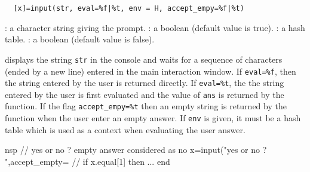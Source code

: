 \begin{mandesc}
\end{mandesc}
\begin{calling_sequence}
\begin{verbatim}
  [x]=input(str, eval=%f|%t, env = H, accept_empy=%f|%t)     
\end{verbatim}
\end{calling_sequence}
\begin{parameters}
  \begin{varlist}
    : a character string giving the prompt.
    : a boolean (default value is true).
    : a hash table.
    : a boolean (default value is false).
  \end{varlist}
\end{parameters}
\begin{mandescription}
  displays the string \verb!str! in the console and waits for a sequence 
  of characters (ended by a new line) entered in the main interaction 
  window. If \verb!eval=%f!, then the string entered by the user is 
  returned directly. If \verb!eval=%t!, the the string entered by the 
  user is first evaluated and the value of \verb!ans! is returned by 
  the function. If the flag \verb!accept_empy=%t! then an empty string 
  is returned by the function when the user enter an empty answer. 
  If \verb!env! is given, it must be a hash table which is used as a 
  context when evaluating the user answer.
\end{mandescription}
\begin{examples}
  \begin{mintednsp}{nsp}
    // yes or no ? empty answer considered as no 
    x=input("yes or no ? ",accept_empty=%
    // if x.equal[1] then ... end 
  \end{mintednsp}
\end{examples}

